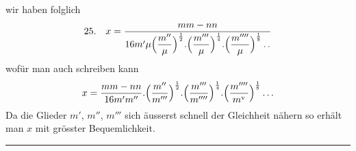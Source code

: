 
wir haben folglich
\[
\begin{gathered}25.\quad x=\frac{mm-nn}{16m'\mu\Bigl(\dfrac{m''}{\mu}\Bigr)^{\frac12}.\Bigl(\dfrac{m'''}{\mu}\Bigr)^{\frac14}.\Bigl(\dfrac{m''''}{\mu}\Bigr)^{\frac18}\mathinner{.\,.}}\end{gathered}
\]
wofür man auch schreiben kann
\[
\begin{gathered}x=\frac{mm-nn}{16m'm''}.\Bigl(\frac{m''}{m'''}\Bigr)^{\frac12}.\Bigl(\frac{m'''}{m''''}\Bigr)^{\frac14}.\Bigl(\frac{m''''}{m^{\mathrm{v}}}\Bigr)^{\frac18}\mathinner{.\,.\,.}\end{gathered}
\]
Da die Glieder $m'$, $m''$, $m'''$ sich äusserst schnell der Gleichheit nähern so erhält man $x$ mit grösster Bequemlichkeit.
\begin{center}\rule{0.25\textwidth}{0.3pt}\end{center}





